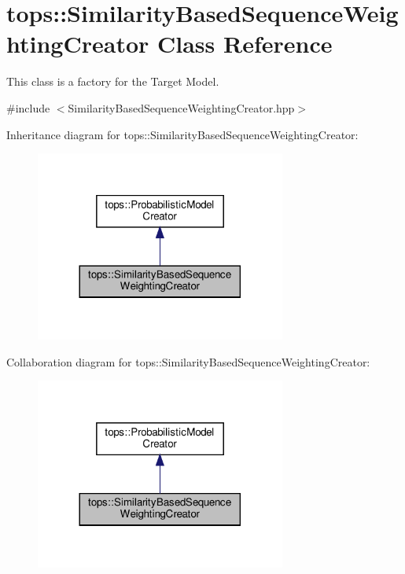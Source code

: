 \hypertarget{classtops_1_1SimilarityBasedSequenceWeightingCreator}{}\section{tops\+:\+:Similarity\+Based\+Sequence\+Weighting\+Creator Class Reference}
\label{classtops_1_1SimilarityBasedSequenceWeightingCreator}


This class is a factory for the Target Model.  




{\ttfamily \#include $<$Similarity\+Based\+Sequence\+Weighting\+Creator.\+hpp$>$}



Inheritance diagram for tops\+:\+:Similarity\+Based\+Sequence\+Weighting\+Creator\+:
\nopagebreak
\begin{figure}[H]
\begin{center}
\leavevmode
\includegraphics[width=233pt]{classtops_1_1SimilarityBasedSequenceWeightingCreator__inherit__graph}
\end{center}
\end{figure}


Collaboration diagram for tops\+:\+:Similarity\+Based\+Sequence\+Weighting\+Creator\+:
\nopagebreak
\begin{figure}[H]
\begin{center}
\leavevmode
\includegraphics[width=233pt]{classtops_1_1SimilarityBasedSequenceWeightingCreator__coll__graph}
\end{center}
\end{figure}
